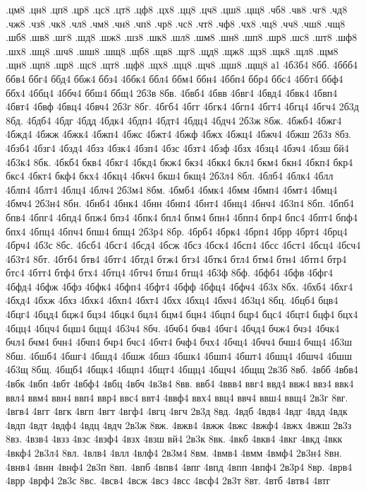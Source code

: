 {.цм8
.цн8
.цп8
.цр8
.цс8
.цт8
.цф8
.цх8
.цц8
.цч8
.цш8
.цщ8
.чб8
.чв8
.чг8
.чд8
.чж8
.чз8
.чк8
.чл8
.чм8
.чн8
.чп8
.чр8
.чс8
.чт8
.чф8
.чх8
.чц8
.чч8
.чш8
.чщ8
.шб8
.шв8
.шг8
.шд8
.шж8
.шз8
.шк8
.шл8
.шм8
.шн8
.шп8
.шр8
.шс8
.шт8
.шф8
.шх8
.шц8
.шч8
.шш8
.шщ8
.щб8
.щв8
.щг8
.щд8
.щж8
.щз8
.щк8
.щл8
.щм8
.щн8
.щп8
.щр8
.щс8
.щт8
.щф8
.щх8
.щц8
.щч8
.щш8
.щщ8
а1
4б3б4
8бб.
4ббб4
ббв4
ббг4
ббд4
ббж4
ббз4
4ббк4
ббл4
ббм4
ббн4
4ббп4
ббр4
ббс4
4ббт4
ббф4
ббх4
4ббц4
4ббч4
ббш4
ббщ4
2б3в
8бв.
4бвб4
4бвв
4бвг4
4бвд4
4бвк4
4бвп4
4бвт4
4бвф
4бвц4
4бвч4
2б3г
8бг.
4бгб4
4бгг
4бгк4
4бгп4
4бгт4
4бгц4
4бгч4
2б3д
8бд.
4бдб4
4бдг
4бдд
4бдк4
4бдп4
4бдт4
4бдц4
4бдч4
2б3ж
8бж.
4бжб4
4бжг4
4бжд4
4бжж
4бжк4
4бжп4
4бжс
4бжт4
4бжф
4бжх
4бжц4
4бжч4
4бжш
2б3з
8бз.
4бзб4
4бзг4
4бзд4
4бзз
4бзк4
4бзп4
4бзс
4бзт4
4бзф
4бзх
4бзц4
4бзч4
4бзш
бй4
4б3к4
8бк.
4бкб4
бкв4
4бкг4
4бкд4
бкж4
бкз4
4бкк4
бкл4
бкм4
бкн4
4бкп4
бкр4
бкс4
4бкт4
бкф4
бкх4
4бкц4
4бкч4
бкш4
бкщ4
2б3л4
8бл.
4блб4
4блк4
4блл
4блп4
4блт4
4блц4
4блч4
2б3м4
8бм.
4бмб4
4бмк4
4бмм
4бмп4
4бмт4
4бмц4
4бмч4
2б3н4
8бн.
4бнб4
4бнк4
4бнн
4бнп4
4бнт4
4бнц4
4бнч4
4б3п4
8бп.
4бпб4
бпв4
4бпг4
4бпд4
бпж4
бпз4
4бпк4
бпл4
бпм4
бпн4
4бпп4
бпр4
бпс4
4бпт4
бпф4
бпх4
4бпц4
4бпч4
бпш4
бпщ4
2б3р4
8бр.
4брб4
4брк4
4брп4
4брр
4брт4
4брц4
4брч4
4б3с
8бс.
4бсб4
4бсг4
4бсд4
4бсж
4бсз
4бск4
4бсп4
4бсс
4бст4
4бсц4
4бсч4
4б3т4
8бт.
4бтб4
бтв4
4бтг4
4бтд4
бтж4
бтз4
4бтк4
бтл4
бтм4
бтн4
4бтп4
бтр4
бтс4
4бтт4
бтф4
бтх4
4бтц4
4бтч4
бтш4
бтщ4
4б3ф
8бф.
4бфб4
4бфв
4бфг4
4бфд4
4бфж
4бфз
4бфк4
4бфп4
4бфт4
4бфф
4бфц4
4бфч4
4б3х
8бх.
4бхб4
4бхг4
4бхд4
4бхж
4бхз
4бхк4
4бхп4
4бхт4
4бхх
4бхц4
4бхч4
4б3ц4
8бц.
4бцб4
бцв4
4бцг4
4бцд4
бцж4
бцз4
4бцк4
бцл4
бцм4
бцн4
4бцп4
бцр4
бцс4
4бцт4
бцф4
бцх4
4бцц4
4бцч4
бцш4
бцщ4
4б3ч4
8бч.
4бчб4
бчв4
4бчг4
4бчд4
бчж4
бчз4
4бчк4
бчл4
бчм4
бчн4
4бчп4
бчр4
бчс4
4бчт4
бчф4
бчх4
4бчц4
4бчч4
бчш4
бчщ4
4б3ш
8бш.
4бшб4
4бшг4
4бшд4
4бшж
4бшз
4бшк4
4бшп4
4бшт4
4бшц4
4бшч4
4бшш
4б3щ
8бщ.
4бщб4
4бщк4
4бщп4
4бщт4
4бщц4
4бщч4
4бщщ
2в3б
8вб.
4вбб
4вбв4
4вбк
4вбп
4вбт
4вбф4
4вбц
4вбч
4в3в4
8вв.
ввб4
4ввв4
ввг4
ввд4
ввж4
ввз4
ввк4
ввл4
ввм4
ввн4
ввп4
ввр4
ввс4
ввт4
4ввф4
ввх4
ввц4
ввч4
ввш4
ввщ4
2в3г
8вг.
4вгв4
4вгг
4вгк
4вгп
4вгт
4вгф4
4вгц
4вгч
2в3д
8вд.
4вдб
4вдв4
4вдг
4вдд
4вдк
4вдп
4вдт
4вдф4
4вдц
4вдч
2в3ж
8вж.
4вжв4
4вжж
4вжс
4вжф4
4вжх
4вжш
2в3з
8вз.
4взв4
4взз
4взс
4взф4
4взх
4взш
вй4
2в3к
8вк.
4вкб
4вкв4
4вкг
4вкд
4вкк
4вкф4
2в3л4
8вл.
4влв4
4влл
4влф4
2в3м4
8вм.
4вмв4
4вмм
4вмф4
2в3н4
8вн.
4внв4
4внн
4внф4
2в3п
8вп.
4впб
4впв4
4впг
4впд
4впп
4впф4
2в3р4
8вр.
4врв4
4врр
4врф4
2в3с
8вс.
4всв4
4всж
4всз
4всс
4всф4
2в3т
8вт.
4втб
4втв4
4втг
}
